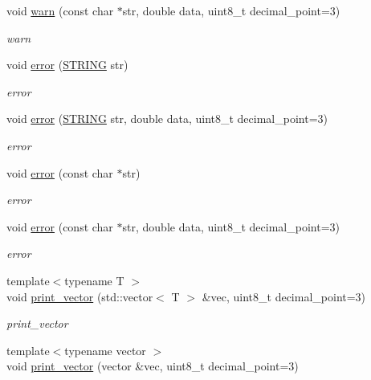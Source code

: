 \begin{DoxyCompactItemize}
void \hyperlink{namespacerobotis__manipulator_1_1log_a6b4909ba686cc8ca3f5e4ee9b3eb5ec1}{warn} (const char $\ast$str, double data, uint8\+\_\+t decimal\+\_\+point=3)
\begin{DoxyCompactList}\small\item\em warn \end{DoxyCompactList}\item 
void \hyperlink{namespacerobotis__manipulator_1_1log_a6a84cb5481107ad244344093086fb557}{error} (\hyperlink{robotis__manipulator__log_8h_a67f156408fa9d656017c406fe4f4b330}{S\+T\+R\+I\+NG} str)
\begin{DoxyCompactList}\small\item\em error \end{DoxyCompactList}\item 
void \hyperlink{namespacerobotis__manipulator_1_1log_a2faeaa077a29ebfbdb2068f383574910}{error} (\hyperlink{robotis__manipulator__log_8h_a67f156408fa9d656017c406fe4f4b330}{S\+T\+R\+I\+NG} str, double data, uint8\+\_\+t decimal\+\_\+point=3)
\begin{DoxyCompactList}\small\item\em error \end{DoxyCompactList}\item 
void \hyperlink{namespacerobotis__manipulator_1_1log_a13df150c610fb95cf665a6d0673509b3}{error} (const char $\ast$str)
\begin{DoxyCompactList}\small\item\em error \end{DoxyCompactList}\item 
void \hyperlink{namespacerobotis__manipulator_1_1log_a19ab54a58a24d8f90c05cc10991561f4}{error} (const char $\ast$str, double data, uint8\+\_\+t decimal\+\_\+point=3)
\begin{DoxyCompactList}\small\item\em error \end{DoxyCompactList}\item 
{\footnotesize template$<$typename T $>$ }\\void \hyperlink{namespacerobotis__manipulator_1_1log_ab016bbac8ea97650fc14bd1be2ccdec5}{print\+\_\+vector} (std\+::vector$<$ T $>$ \&vec, uint8\+\_\+t decimal\+\_\+point=3)
\begin{DoxyCompactList}\small\item\em print\+\_\+vector \end{DoxyCompactList}\item 
{\footnotesize template$<$typename vector $>$ }\\void \hyperlink{namespacerobotis__manipulator_1_1log_a389a6cffbc5d0fad712e0eac8507a2ec}{print\+\_\+vector} (vector \&vec, uint8\+\_\+t decimal\+\_\+point=3)

\end{DoxyCompactItemize}
